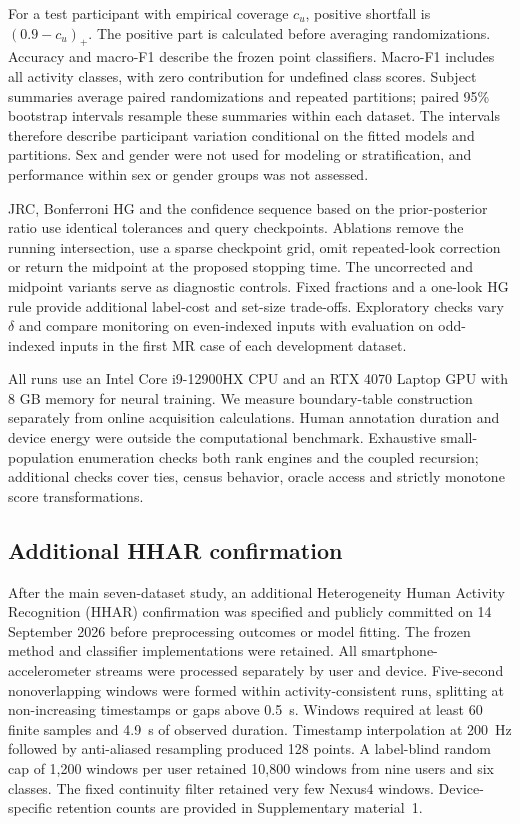 \documentclass[preprint,12pt]{elsarticle}
\begin{document}
For a test participant with empirical coverage $c_u$, positive shortfall is $(0.9-c_u)_+$. The positive part is calculated before averaging randomizations. Accuracy and macro-F1 describe the frozen point classifiers. Macro-F1 includes all activity classes, with zero contribution for undefined class scores. Subject summaries average paired randomizations and repeated partitions; paired 95\% bootstrap intervals resample these summaries within each dataset. The intervals therefore describe participant variation conditional on the fitted models and partitions. Sex and gender were not used for modeling or stratification, and performance within sex or gender groups was not assessed.

JRC, Bonferroni HG and the confidence sequence based on the prior-posterior ratio use identical tolerances and query checkpoints. Ablations remove the running intersection, use a sparse checkpoint grid, omit repeated-look correction or return the midpoint at the proposed stopping time. The uncorrected and midpoint variants serve as diagnostic controls. Fixed fractions and a one-look HG rule provide additional label-cost and set-size trade-offs. Exploratory checks vary $\delta$ and compare monitoring on even-indexed inputs with evaluation on odd-indexed inputs in the first MR case of each development dataset.

All runs use an Intel Core i9-12900HX CPU and an RTX 4070 Laptop GPU with 8 GB memory for neural training. We measure boundary-table construction separately from online acquisition calculations. Human annotation duration and device energy were outside the computational benchmark. Exhaustive small-population enumeration checks both rank engines and the coupled recursion; additional checks cover ties, census behavior, oracle access and strictly monotone score transformations.



\subsection{Additional HHAR confirmation}
After the main seven-dataset study, an additional Heterogeneity Human Activity Recognition (HHAR) confirmation \cite{hhar} was specified and publicly committed on 14 September 2026 before preprocessing outcomes or model fitting. The frozen method and classifier implementations were retained. All smartphone-accelerometer streams were processed separately by user and device. Five-second nonoverlapping windows were formed within activity-consistent runs, splitting at non-increasing timestamps or gaps above 0.5~s. Windows required at least 60 finite samples and 4.9~s of observed duration. Timestamp interpolation at 200~Hz followed by anti-aliased resampling produced 128 points. A label-blind random cap of 1,200 windows per user retained 10,800 windows from nine users and six classes. The fixed continuity filter retained very few Nexus4 windows. Device-specific retention counts are provided in Supplementary material~1.
\end{document}
